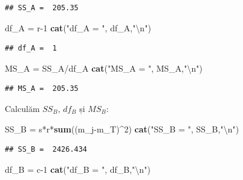 \documentclass[]{article}
\newenvironment{Shaded}{\begin{snugshade}}{\end{snugshade}}
\newcommand{\KeywordTok}[1]{\textcolor[rgb]{0.13,0.29,0.53}{\textbf{{#1}}}}
\newcommand{\DecValTok}[1]{\textcolor[rgb]{0.00,0.00,0.81}{{#1}}}
\newcommand{\CharTok}[1]{\textcolor[rgb]{0.31,0.60,0.02}{{#1}}}
\newcommand{\StringTok}[1]{\textcolor[rgb]{0.31,0.60,0.02}{{#1}}}
\newcommand{\NormalTok}[1]{{#1}}
\begin{document}
\begin{verbatim}
## SS_A =  205.35
\end{verbatim}

\begin{Shaded}
\begin{Highlighting}[]
\NormalTok{df_A =}\StringTok{ }\NormalTok{r}\DecValTok{-1}
\KeywordTok{cat}\NormalTok{(}\StringTok{"df_A = "}\NormalTok{, df_A,}\StringTok{"}\CharTok{\textbackslash{}n}\StringTok{"}\NormalTok{)}
\end{Highlighting}
\end{Shaded}

\begin{verbatim}
## df_A =  1
\end{verbatim}

\begin{Shaded}
\begin{Highlighting}[]
\NormalTok{MS_A =}\StringTok{ }\NormalTok{SS_A/df_A}
\KeywordTok{cat}\NormalTok{(}\StringTok{"MS_A = "}\NormalTok{, MS_A,}\StringTok{"}\CharTok{\textbackslash{}n}\StringTok{"}\NormalTok{)}
\end{Highlighting}
\end{Shaded}

\begin{verbatim}
## MS_A =  205.35
\end{verbatim}

Calculăm \(SS_B\), \(df_B\) și \(MS_B\):

\begin{Shaded}
\begin{Highlighting}[]
\NormalTok{SS_B =}\StringTok{ }\NormalTok{s*r*}\KeywordTok{sum}\NormalTok{((m_j-m_T)^}\DecValTok{2}\NormalTok{)}
\KeywordTok{cat}\NormalTok{(}\StringTok{"SS_B = "}\NormalTok{, SS_B,}\StringTok{"}\CharTok{\textbackslash{}n}\StringTok{"}\NormalTok{)}
\end{Highlighting}
\end{Shaded}

\begin{verbatim}
## SS_B =  2426.434
\end{verbatim}

\begin{Shaded}
\begin{Highlighting}[]
\NormalTok{df_B =}\StringTok{ }\NormalTok{c}\DecValTok{-1}
\KeywordTok{cat}\NormalTok{(}\StringTok{"df_B = "}\NormalTok{, df_B,}\StringTok{"}\CharTok{\textbackslash{}n}\StringTok{"}\NormalTok{)}
\end{Highlighting}
\end{Shaded}
\end{document}
